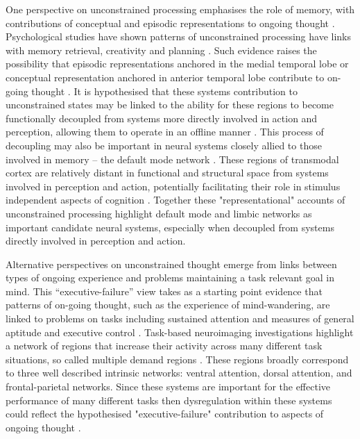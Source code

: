 One perspective on unconstrained processing emphasises the role of memory, with contributions of conceptual and episodic representations to ongoing thought \cite{Binder2009,Gusnard2001}. 
Psychological studies have shown patterns of unconstrained processing have links with memory retrieval, creativity and planning \cite{Baird2012,Leszczynski2017,Medea2016,Poerio2017}. 
Such evidence raises the possibility that episodic representations anchored in the medial temporal lobe \cite{Moscovitch2016} 
or conceptual representation anchored in anterior temporal lobe \cite{Lambon-Ralph2016} 
contribute to on-going thought \cite{Smallwood2016}. 
It is hypothesised that these systems contribution to unconstrained states may be linked to the ability for these regions to become functionally decoupled from systems more directly involved in action and perception, allowing them to operate in an offline manner \cite{Smallwood2013a}. 
This process of decoupling may also be important in neural systems closely allied to those involved in memory – the default mode network \cite{Raichle2001}. 
These regions of transmodal cortex are relatively distant in functional and structural space from systems involved in perception and action, potentially facilitating their role in stimulus independent aspects of cognition \cite{Buckner2013,Margulies2016,Mesulam1998}. 
Together these "representational" accounts of unconstrained processing highlight default mode and limbic networks as important candidate neural systems, especially when decoupled from systems directly involved in perception and action.

Alternative perspectives on unconstrained thought emerge from links between types of ongoing experience and problems maintaining a task relevant goal in mind. This “executive-failure” view \cite{Kane2012,McVay2009}%
takes as a starting point evidence that patterns of on-going thought, such as the experience of mind-wandering, are linked to problems on tasks including sustained attention \cite{McVay2009}
and measures of general aptitude and executive control \cite{Mrazek2012}. 
Task-based neuroimaging investigations highlight a network of regions that increase their activity across many different task situations, so called multiple demand regions \cite{Duncan2010}. %
These regions broadly correspond to three well described intrinsic networks: ventral attention, dorsal attention, and frontal-parietal networks. Since these systems are important for the effective performance of many different tasks then dysregulation within these systems could reflect the hypothesised "executive-failure" contribution to aspects of ongoing thought \cite{McVay2009,Weissman2006}.%

